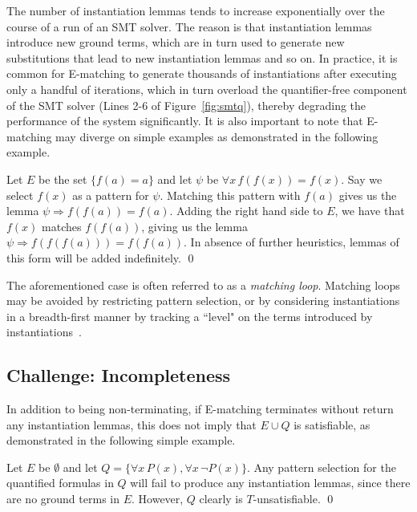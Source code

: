 \documentclass[oribibl]{llncs}
\begin{document}
The number of instantiation lemmas tends to increase exponentially over the course of a run of an SMT solver.
The reason is that instantiation lemmas introduce new ground terms, which are in turn used to generate new substitutions that lead to
new instantiation lemmas and so on.
In practice, it is common for E-matching to generate thousands of instantiations after executing only a handful of iterations,
which in turn overload the quantifier-free component of the SMT solver (Lines 2-6 of Figure~\ref{fig:smtq}),
thereby degrading the performance of the system significantly.
It is also important to note that E-matching may diverge on simple examples
as demonstrated in the following example.

\begin{example}
Let $E$ be the set $\{ f( a ) = a \}$ and let $\psi$ be $\forall x\, f( f( x ) ) = f( x )$.
Say we select $f( x )$ as a pattern for $\psi$.
Matching this pattern with $f( a )$ gives us the lemma $\psi \Rightarrow f( f( a ) ) = f( a )$.
Adding the right hand side to $E$, we have that $f( x )$ matches $f( f( a ) )$, giving us the lemma $\psi \Rightarrow f( f( f( a ) ) ) = f( f( a ) )$.
In absence of further heuristics, lemmas of this form will be added indefinitely.
\qed
\end{example}

The aforementioned case is often referred to as a \emph{matching loop}.
Matching loops may be avoided by
restricting pattern selection, or by
considering instantiations in a breadth-first manner by tracking a ``level" on the terms introduced by instantiations~\cite{GeBarrettTinelli07}.

\subsection{Challenge: Incompleteness}

In addition to being non-terminating, if E-matching terminates without return any instantiation lemmas,
this does not imply that $E \cup Q$ is satisfiable, as demonstrated in the following simple example.

\begin{example}
Let $E$ be $\emptyset$ and let $Q = \{ \forall x\, P( x ), \forall x\, \neg P( x ) \}$.
Any pattern selection for the quantified formulas in $Q$ will fail to produce any instantiation lemmas,
since there are no ground terms in $E$.
However, $Q$ clearly is $T$-unsatisfiable.
\qed
\end{example}
\end{document}
